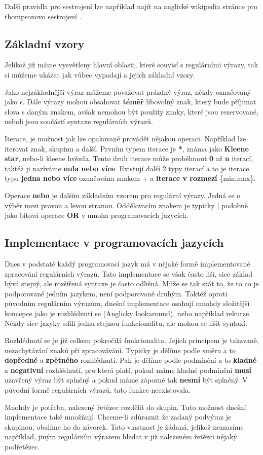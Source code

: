 Další pravidla pro sestrojení lze například najít na anglické wikipedia stránce pro thompsonovo sestrojení \cite{Wikipedia_2023}.

\subsection*{Základní vzory}
Jelikož již máme vysvětleny hlavní oblasti, které souvisí s regulárními výrazy, tak si můžeme ukázat 
jak vůbec vypadají a jejich základní vzory.

Jako nejzákladnější výraz můžeme považovat prázdný výraz, někdy označovaný jako $\epsilon$. 
Dále výrazy mohou obsahovat \textbf{téměř} libovolný znak, který bude příjimat slova s daným znakem, avšak nemohou být použity znaky, které jsou rezervované, neboli jsou součástí syntaxe regulárních výrazů.

Iterace, je možnost jak lze opakovaně provádět nějakou operaci.
Například lze iterovat znak, skupinu a další.
Prvním typem iterace je \textbf{*}, známa jako \textbf{Kleene star}, nebo-li kleene hvězda.
Tento druh iterace může proběhnout \textbf{0} až \textbf{n} iterací, taktéž ji nazíváme \textbf{nula nebo více}. 
Existují další 2 typy iterací a to je iterace typu \textbf{jedna nebo více} označována znakem + a \textbf{iterace v rozmezí} \{min,max\}.

Operace \textbf{nebo} je dalším základním vzorem pro regulární výrazy. 
Jedná se o výběr mezi pravou a levou stranou. Oddělovacím znakem je typicky | podobně jako bitová operace \textbf{OR} v mnoha programovacích jazycích.

\subsection*{Implementace v programovacích jazycích}

Dnes v podstatě každý programovací jazyk má v nějaké formě implementované zpracování regulárních výrazů.
Tato implementace se však často liší, sice základ bývá stejný, ale rozšířená syntaxe je často odlišná.
Může se tak stát to, že to co je podporované jedním jazykem, není podporované druhým.
Taktéž oproti původním regulárním výrazům, dnešní implementace osahují mnohdy složitější
koncepce jako je rozhlédnutí se (Anglicky lookaround), nebo například rekurze.
Někdy sice jazyky sdílí jednu stejnou funkcionalitu, ale mohou se lišit syntaxí.

Rozhlédnutí se je již celkem pokročilá funkcionalita. 
Jejich principem je takzvaně, nezachytávání znaků při zpracovávání.
Typicky je dělíme podle směru a to \textbf{dopředné} a \textbf{zpětného} rozhlédnutí.
Pak je dělíme podle podmínění a to \textbf{kladné} a \textbf{negativní} rozhlédnutí, pro která platí,
pokud máme kladné podmínění \textbf{musí} uzavřený výraz být splněný a pokud máme záporné tak \textbf{nesmí} být splněný.
V původní formě regulárních výrazů, tato funkce neexistovala.

Mnohdy je potřeba, nalezený řetězec rozdělit do skupin. 
Tuto možnost dnešní implementace také umožňují.
Chceme-li zdůraznit že zadaný podvýraz je skupinou, obalíme ho do závorek.
Tato vlastnost je žádaná, jelikož nemusíme například, jiným regulárním výrazem hledat
v již nalezeném řetězci nějaký podřetězec.

\endinput